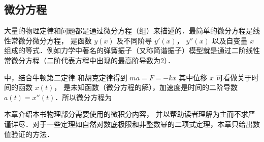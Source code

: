 \subsection{微分方程}
大量的物理定律和问题都是通过微分方程（组）来描述的．最简单的微分方程是线性常微分微分方程，%
是函数 $y(x)$ 及不同阶导 $y'(x)$，  $y''(x)$ 以及自变量 $x$ 组成的等式．例如力学中著名的弹簧振子（又称简谐振子）模型就是通过二阶线性常微分方程（二阶代表方程中出现的最高阶导数为2）．

中，结合牛顿第二定律 和胡克定律得到 $ma = F = -kx$ 其中位移 $x$ 可看做关于时间的函数 $x(t)$， 是未知函数（微分方程的解），加速度是时间的二阶导数 $a(t) = x''(t)$．所以微分方程为 

本章介绍本书物理部分需要使用的微积分内容，
并以帮助读者理解为主而不求严谨详尽．对于一些定理如自然对数底极限和非整数幂的二项式定理，本章只给出数值验证的方法．



